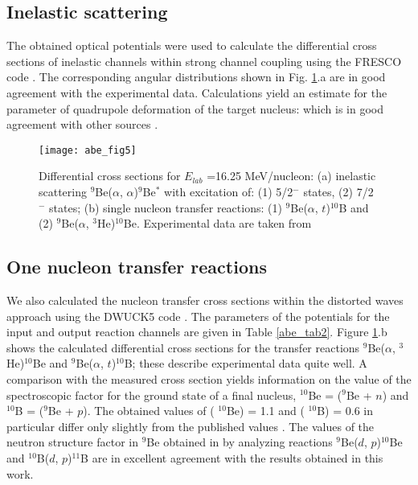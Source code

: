 \documentclass[
12pt, %
oneside, %
english, %
onehalfspacing, %
onehalfspacing, %
headsepline, %
]{MastersDoctoralThesis} %
\begin{document}
\subsection{Inelastic scattering}
The obtained optical potentials were used to calculate the differential cross sections of inelastic channels within strong channel coupling using the FRESCO code \cite{fresco}. 
The corresponding angular distributions shown in Fig. \ref{abe_fig5}.a are in good agreement with the experimental data. 
Calculations yield an estimate for the parameter of quadrupole deformation of the target
nucleus:   which is in good agreement with other sources \cite{harakeh1980strong, roy1995coupled, lukyanov2014study}.


\begin{figure}[tp]
\centering
\texttt{[image: abe\_fig5]}
\decoRule
\caption{\footnotesize  Differential cross sections for $E_{lab}$ =16.25 MeV/nucleon: (a) inelastic scattering $^9$Be($\alpha$, $\alpha$)$^9$Be$^*$ with excitation of:  (1) 5/2${}^{-}$ states, (2) 7/2$^{-}$ states; (b) single nucleon transfer reactions: (1)  ${}^{9}$Be($\alpha$, $t$)${}^{10}$B and (2) ${}^{9}$Be($\alpha$,  ${}^{3}$He)${}^{10}$Be. Experimental data are taken from \cite{harakeh1980strong, roy1995coupled, lukyanov2014study}
}
\label{abe_fig5}
\end{figure}


\subsection{One nucleon transfer reactions}
We also calculated the nucleon transfer cross sections within the distorted waves approach using the DWUCK5 code \cite{kunz}. The parameters of the potentials for the input and output reaction channels are given in Table \ref{abe_tab2}. 
Figure \ref{abe_fig5}.b shows the calculated differential cross sections for the transfer reactions ${}^{9}$Be($\alpha$,  ${}^{3}$He)${}^{10}$Be and ${}^{9}$Be($\alpha$, $t$)${}^{10}$B; these describe experimental data quite well. 
A comparison with the measured cross section yields information on the value of the spectroscopic factor   for the ground state of a final nucleus, $^{10}$Be = (${}^{9}$Be + $n$) and $^{10}$B = (${}^{9}$Be + $p$). The obtained values of  ( $^{10}$Be) = 1.1 and  ( $^{10}$B) =
0.6 in particular differ only slightly from the published values \cite{harakeh1980strong, lukyanov2014study, galanina2012mechanisms}. 
The values of the neutron structure factor in ${}^{9}$Be obtained in \cite{galanina2012mechanisms} by analyzing reactions ${}^{9}$Be($d$, $p$)${}^{10}$Be and ${}^{10}$B($d$, $p$)${}^{11}$B are in excellent agreement with the results obtained in this work.
\end{document}
